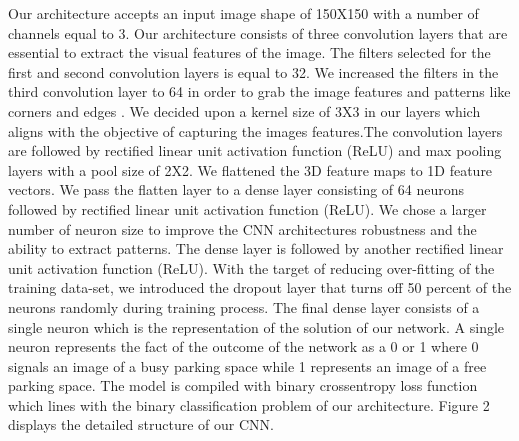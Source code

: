 \documentclass[conference]{IEEEtran}
\begin{document}
Our architecture accepts an input image shape of 150X150 with a number of channels equal to 3. Our architecture consists of three convolution layers that are essential to extract the visual features of the image. The filters selected for the first and second convolution layers is equal to 32. We increased the filters in the third convolution layer to 64 in order to grab the image features and patterns like corners and edges \cite{b5}. We decided upon a kernel size of 3X3 in our layers which
aligns with the objective of capturing the images features.The convolution layers are followed by rectified linear unit activation function (ReLU) and max pooling layers with a pool size of 2X2. We flattened the 3D feature maps to 1D feature vectors. We pass the flatten layer to a dense layer consisting of 64 neurons followed by rectified linear unit activation function (ReLU). We chose a larger number of neuron size to improve the CNN architectures robustness and the ability to extract patterns. The dense layer is followed by another rectified linear unit activation function (ReLU). With the target of reducing over-fitting of the training data-set, we introduced the dropout layer that turns off 50 percent of the neurons randomly during training process. The final dense layer consists of a single neuron which is the representation of the solution of our network. A single neuron represents the fact of the outcome of the network as a 0 or 1 where 0 signals an image of a busy parking space while 1 represents an image of a free parking space. The model is compiled with binary crossentropy loss function which lines with the binary classification problem of our architecture. 
Figure 2 displays the detailed structure of our CNN.
\end{document}
